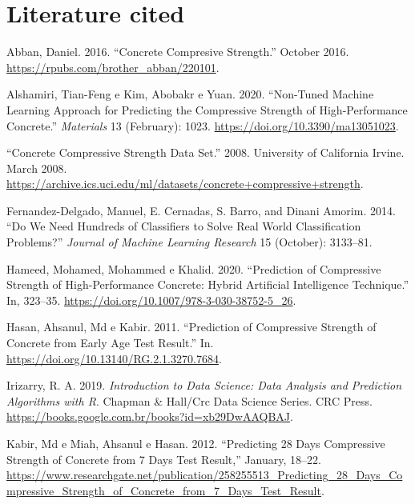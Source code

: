 \documentclass[
]{article}
\begin{document}
\hypertarget{literature-cited}{%
\section{Literature cited}\label{literature-cited}}

\hypertarget{refs}{}
\leavevmode\hypertarget{ref-Abban2016}{}%
Abban, Daniel. 2016. ``Concrete Compresive Strength.'' October 2016.
\url{https://rpubs.com/brother_abban/220101}.

\leavevmode\hypertarget{ref-Alshamiri2020}{}%
Alshamiri, Tian-Feng e Kim, Abobakr e Yuan. 2020. ``Non-Tuned Machine
Learning Approach for Predicting the Compressive Strength of
High-Performance Concrete.'' \emph{Materials} 13 (February): 1023.
\url{https://doi.org/10.3390/ma13051023}.

\leavevmode\hypertarget{ref-downloadData}{}%
``Concrete Compressive Strength Data Set.'' 2008. University of
California Irvine. March 2008.
\url{https://archive.ics.uci.edu/ml/datasets/concrete+compressive+strength}.

\leavevmode\hypertarget{ref-Fernandez2014}{}%
Fernandez-Delgado, Manuel, E. Cernadas, S. Barro, and Dinani Amorim.
2014. ``Do We Need Hundreds of Classifiers to Solve Real World
Classification Problems?'' \emph{Journal of Machine Learning Research}
15 (October): 3133--81.

\leavevmode\hypertarget{ref-Hameed2020}{}%
Hameed, Mohamed, Mohammed e Khalid. 2020. ``Prediction of Compressive
Strength of High-Performance Concrete: Hybrid Artificial Intelligence
Technique.'' In, 323--35.
\url{https://doi.org/10.1007/978-3-030-38752-5_26}.

\leavevmode\hypertarget{ref-Hasan2011}{}%
Hasan, Ahsanul, Md e Kabir. 2011. ``Prediction of Compressive Strength
of Concrete from Early Age Test Result.'' In.
\url{https://doi.org/10.13140/RG.2.1.3270.7684}.

\leavevmode\hypertarget{ref-irizarry2019}{}%
Irizarry, R. A. 2019. \emph{Introduction to Data Science: Data Analysis
and Prediction Algorithms with R}. Chapman \& Hall/Crc Data Science
Series. CRC Press.
\url{https://books.google.com.br/books?id=xb29DwAAQBAJ}.

\leavevmode\hypertarget{ref-Kabir2012}{}%
Kabir, Md e Miah, Ahsanul e Hasan. 2012. ``Predicting 28 Days
Compressive Strength of Concrete from 7 Days Test Result,'' January,
18--22.
\url{https://www.researchgate.net/publication/258255513_Predicting_28_Days_Compressive_Strength_of_Concrete_from_7_Days_Test_Result}.
\end{document}
